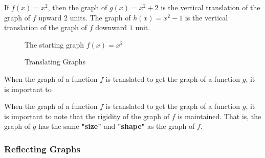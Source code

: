 \begin{example}
  \label{exm:translating}

  If $f(x) = x^{2}$, then the graph of $g(x) = x^{2} + 2$ is the vertical
  translation of the graph of $f$ upward $2$ units. The graph of $h(x) = x^{2} -
  1$ is the vertical translation of the graph of $f$ downward $1$ unit.
  
  \begin{figure}[H]
    \centering
    \caption{The starting graph $f(x) = x^{2}$}
    \label{fig:translating_start}
  \end{figure}

  \begin{figure}[H]
    \centering
    \qquad
    \caption{Translating Graphs}
    \label{fig:translating_end}
  \end{figure}

  When the graph of a function $f$ is translated to get the graph of a function
  $g$, it is important to 
\end{example}

\begin{note}
  \label{nte:translating}

  When the graph of a function $f$ is translated to get the graph of a function
  $g$, it is important to note that the rigidity of the graph of $f$ is
  maintained. That is, the graph of $g$ has the same \textbf{"size"} and
  \textbf{"shape"} as the graph of $f$.
\end{note}


\subsubsection{Reflecting Graphs}
\label{sub_sub_sec:reflecting_graphs}

